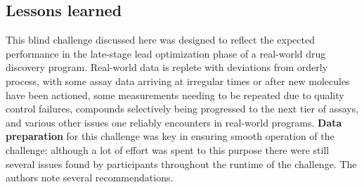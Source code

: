 \documentclass[journal=jcim,manuscript=article]{achemso}
\begin{document}
\subsection{Lessons learned}
This blind challenge discussed here was designed to reflect the expected performance in the late-stage lead optimization phase of a real-world drug discovery program. Real-world data is replete with deviations from orderly process, with some assay data arriving at irregular times or after new molecules have been actioned, some measurements needing to be repeated due to quality control failures, compounds selectively being progressed to the next tier of assays, and various other issues one reliably encounters in real-world programs. \textbf{Data preparation} for this challenge was key in ensuring smooth operation of the challenge; although a lot of effort was spent to this purpose there were still several issues found by participants throughout the runtime of the challenge. The authors note several recommendations.
\end{document}
